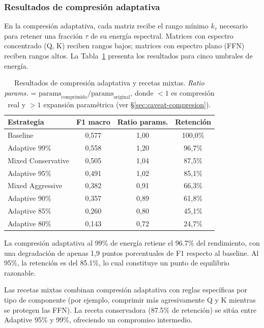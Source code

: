 \subsubsection{Resultados de compresión adaptativa}

En la compresión adaptativa, cada matriz recibe el rango mínimo $k_\tau$ necesario para
retener una fracción $\tau$ de su energía espectral. Matrices con espectro concentrado
(Q, K) reciben rangos bajos; matrices con espectro plano (FFN) reciben rangos altos. La
Tabla~\ref{tab:adaptive} presenta los resultados para cinco umbrales de energía.

\begin{table}[H]
    \centering
    \caption{Resultados de compresión adaptativa y recetas mixtas.
    \emph{Ratio params.} =
    $\text{params}_{\text{comprimido}}/\text{params}_{\text{original}}$,
    donde $<1$ es compresión real y $>1$ expansión paramétrica
    (ver \S\ref{sec:caveat-compresion}).}
    \label{tab:adaptive}
    \small
    \begin{tabular}{@{}lccc@{}}
        \toprule
        \textbf{Estrategia} & \textbf{F1 macro} & \textbf{Ratio params.} & \textbf{Retención} \\
        \midrule
        Baseline             & 0{,}577 & 1{,}00 & 100{,}0\% \\
        Adaptive 99\%        & 0{,}558 & 1{,}20 & 96{,}7\%  \\
        Mixed Conservative   & 0{,}505 & 1{,}04 & 87{,}5\%  \\
        Adaptive 95\%        & 0{,}491 & 1{,}02 & 85{,}1\%  \\
        Mixed Aggressive     & 0{,}382 & 0{,}91 & 66{,}3\%  \\
        Adaptive 90\%        & 0{,}357 & 0{,}89 & 61{,}8\%  \\
        Adaptive 85\%        & 0{,}260 & 0{,}80 & 45{,}1\%  \\
        Adaptive 80\%        & 0{,}143 & 0{,}72 & 24{,}7\%  \\
        \bottomrule
    \end{tabular}
\end{table}

La compresión adaptativa al 99\% de energía retiene el 96.7\% del rendimiento, con
una degradación de apenas 1{,}9 puntos porcentuales de F1 respecto al baseline. Al 95\%,
la retención es del 85.1\%, lo cual constituye un punto de equilibrio razonable.

Las recetas mixtas combinan compresión adaptativa con reglas específicas por tipo de
componente (por ejemplo, comprimir más agresivamente Q y K mientras se protegen las FFN).
La receta conservadora (87.5\% de retención) se sitúa entre Adaptive 95\% y 99\%,
ofreciendo un compromiso intermedio.

